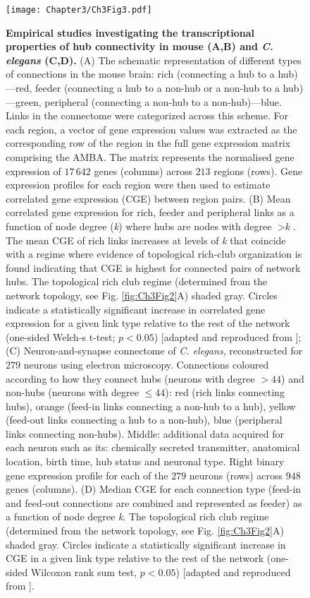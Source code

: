\begin{figure}[!h]
\begin{center}
\texttt{[image: Chapter3/Ch3Fig3.pdf]}%
\end{center}
\caption{\textbf{Empirical studies investigating the transcriptional properties of hub connectivity in mouse (A,B) and \textit{C. elegans} (C,D).} 
(A) The schematic representation of different types of connections in the mouse brain: rich (connecting a hub to a hub)---red, feeder (connecting a hub to a non-hub or a non-hub to a hub)---green, peripheral (connecting a non-hub to a non-hub)---blue. Links in the connectome were categorized across this scheme. For each region, a vector of gene expression values was extracted as the corresponding row of the region in the full gene expression matrix comprising the AMBA. The matrix represents the normalised gene expression of $17\,642$ genes (columns) across $213$ regions (rows). Gene expression profiles for each region were then used to estimate correlated gene expression (CGE) between region pairs. 
(B) Mean correlated gene expression for rich, feeder and peripheral links as a function of node degree (\textit{k}) where hubs are nodes with degree $> \textit{k}$. The mean CGE of rich links increases at levels of \textit{k} that coincide with a regime where evidence of topological rich-club organization is found indicating that CGE is highest for connected pairs of network hubs. The topological rich club regime (determined from the network topology, see Fig. \ref{fig:Ch3Fig2}A) shaded gray. Circles indicate a statistically significant increase in correlated gene expression for a given link type relative to the rest of the network (one-sided Welch-s t-test; $p < 0.05$) [adapted and reproduced from \citet{Fulcher2016}]; 
(C) Neuron-and-synapse connectome of \textit{C. elegans}, reconstructed for $279$ neurons using electron microscopy. Connections coloured according to how they connect hubs (neurons with degree $> 44$) and non-hubs (neurons with degree $≤ 44$): red (rich links connecting hubs), orange (feed-in links connecting a non-hub to a hub), yellow (feed-out links connecting a hub to a non-hub), blue (peripheral links connecting non-hubs). Middle: additional data acquired for each neuron such as its: chemically secreted transmitter, anatomical location, birth time, hub status and neuronal type. Right binary gene expression profile for each of the $279$ neurons (rows) across $948$ genes (columns).
(D) Median CGE for each connection type (feed-in and feed-out connections are combined and represented as feeder) as a function of node degree \textit{k}. The topological rich club regime (determined from the network topology, see Fig. \ref{fig:Ch3Fig2}A) shaded gray. 
Circles indicate a statistically significant increase in CGE in a given link type relative to the rest of the network (one-sided Wilcoxon rank sum test, $p < 0.05$) [adapted and reproduced from \citet{Arnatkeviciute2018}]. } \label{fig:Ch3Fig3}
\end{figure}


